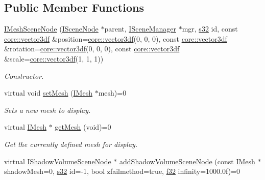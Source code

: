 \subsection*{Public Member Functions}
\begin{DoxyCompactItemize}
\item 
\hyperlink{classirr_1_1scene_1_1IMeshSceneNode_a491d6cac4ec270ab01c24e27c88e6ca4}{I\+Mesh\+Scene\+Node} (\hyperlink{classirr_1_1scene_1_1ISceneNode}{I\+Scene\+Node} $\ast$parent, \hyperlink{classirr_1_1scene_1_1ISceneManager}{I\+Scene\+Manager} $\ast$mgr, \hyperlink{namespaceirr_ac66849b7a6ed16e30ebede579f9b47c6}{s32} id, const \hyperlink{namespaceirr_1_1core_ae6e2b2a6c552833ebbd5b7463d03586b}{core\+::vector3df} \&position=\hyperlink{namespaceirr_1_1core_ae6e2b2a6c552833ebbd5b7463d03586b}{core\+::vector3df}(0, 0, 0), const \hyperlink{namespaceirr_1_1core_ae6e2b2a6c552833ebbd5b7463d03586b}{core\+::vector3df} \&rotation=\hyperlink{namespaceirr_1_1core_ae6e2b2a6c552833ebbd5b7463d03586b}{core\+::vector3df}(0, 0, 0), const \hyperlink{namespaceirr_1_1core_ae6e2b2a6c552833ebbd5b7463d03586b}{core\+::vector3df} \&scale=\hyperlink{namespaceirr_1_1core_ae6e2b2a6c552833ebbd5b7463d03586b}{core\+::vector3df}(1, 1, 1))
\begin{DoxyCompactList}\small\item\em Constructor. \end{DoxyCompactList}\item 
virtual void \hyperlink{classirr_1_1scene_1_1IMeshSceneNode_a8d7e98ddfb990bfc354c9c410a4d788f}{set\+Mesh} (\hyperlink{classirr_1_1scene_1_1IMesh}{I\+Mesh} $\ast$mesh)=0
\begin{DoxyCompactList}\small\item\em Sets a new mesh to display. \end{DoxyCompactList}\item 
virtual \hyperlink{classirr_1_1scene_1_1IMesh}{I\+Mesh} $\ast$ \hyperlink{classirr_1_1scene_1_1IMeshSceneNode_afe540de69bc3a058919cd5ce465be634}{get\+Mesh} (void)=0
\begin{DoxyCompactList}\small\item\em Get the currently defined mesh for display. \end{DoxyCompactList}\item 
virtual \hyperlink{classirr_1_1scene_1_1IShadowVolumeSceneNode}{I\+Shadow\+Volume\+Scene\+Node} $\ast$ \hyperlink{classirr_1_1scene_1_1IMeshSceneNode_ad7cd00b302466dea891c7a0b6b28de19}{add\+Shadow\+Volume\+Scene\+Node} (const \hyperlink{classirr_1_1scene_1_1IMesh}{I\+Mesh} $\ast$shadow\+Mesh=0, \hyperlink{namespaceirr_ac66849b7a6ed16e30ebede579f9b47c6}{s32} id=-\/1, bool zfailmethod=true, \hyperlink{namespaceirr_a0277be98d67dc26ff93b1a6a1d086b07}{f32} infinity=1000.\+0f)=0

\end{DoxyCompactItemize}

